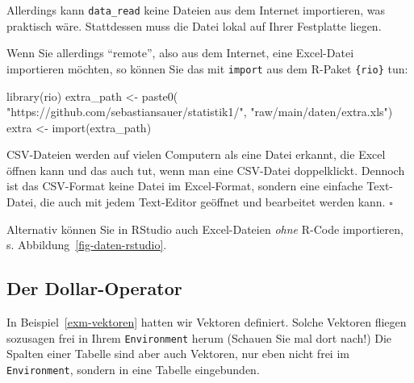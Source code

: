 \documentclass[
  a4paper,
  DIV=11]{scrreprt}
\newenvironment{Shaded}{\begin{snugshade}}{\end{snugshade}}
\newcommand{\FunctionTok}[1]{\textcolor[rgb]{0.28,0.35,0.67}{#1}}
\newcommand{\NormalTok}[1]{\textcolor[rgb]{0.00,0.23,0.31}{#1}}
\newcommand{\OtherTok}[1]{\textcolor[rgb]{0.00,0.23,0.31}{#1}}
\newcommand{\StringTok}[1]{\textcolor[rgb]{0.13,0.47,0.30}{#1}}
\theoremstyle{definition}
\theoremstyle{definition}
\theoremstyle{definition}
\theoremstyle{remark}
\begin{document}
Allerdings kann \texttt{data\_read} keine Dateien aus dem Internet
importieren, was praktisch wäre. Stattdessen muss die Datei lokal auf
Ihrer Festplatte liegen.

Wenn Sie allerdings ``remote'', also aus dem Internet, eine Excel-Datei
importieren möchten, so können Sie das mit \texttt{import} aus dem
R-Paket \texttt{\{rio\}} tun:

\begin{Shaded}
\begin{Highlighting}[]
\FunctionTok{library}\NormalTok{(rio)}
\NormalTok{extra\_path }\OtherTok{\textless{}{-}} \FunctionTok{paste0}\NormalTok{(}
  \StringTok{"https://github.com/sebastiansauer/statistik1/"}\NormalTok{,}
  \StringTok{"raw/main/daten/extra.xls"}\NormalTok{)}
\NormalTok{extra }\OtherTok{\textless{}{-}} \FunctionTok{import}\NormalTok{(extra\_path)}
\end{Highlighting}
\end{Shaded}

\begin{tcolorbox}[enhanced jigsaw, leftrule=.75mm, opacitybacktitle=0.6, colback=white, colframe=quarto-callout-note-color-frame, coltitle=black, colbacktitle=quarto-callout-note-color!10!white, opacityback=0, left=2mm, breakable, titlerule=0mm, toptitle=1mm, bottomtitle=1mm, rightrule=.15mm, title=\textcolor{quarto-callout-note-color}{\faInfo}\hspace{0.5em}{Hinweis}, arc=.35mm, bottomrule=.15mm, toprule=.15mm]

CSV-Dateien werden auf vielen Computern als eine Datei erkannt, die
Excel öffnen kann und das auch tut, wenn man eine CSV-Datei
doppelklickt. Dennoch ist das CSV-Format keine Datei im Excel-Format,
sondern eine einfache Text-Datei, die auch mit jedem Text-Editor
geöffnet und bearbeitet werden kann. \(\square\)

\end{tcolorbox}

Alternativ können Sie in RStudio auch Excel-Dateien \emph{ohne} R-Code
importieren, s. Abbildung~\ref{fig-daten-rstudio}.

\subsection{Der Dollar-Operator}\label{sec-dollar-op}

In Beispiel~\ref{exm-vektoren} hatten wir Vektoren definiert. Solche
Vektoren fliegen sozusagen frei in Ihrem \texttt{Environment} herum
(Schauen Sie mal dort nach!) Die Spalten einer Tabelle sind aber auch
Vektoren, nur eben nicht frei im \texttt{Environment}, sondern in eine
Tabelle eingebunden.
\end{document}
